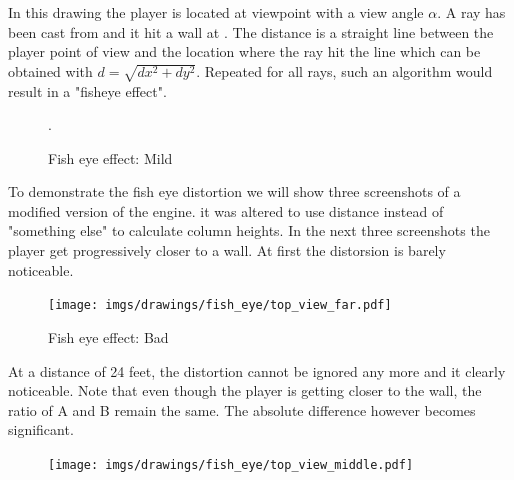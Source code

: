 In this drawing the player is located at viewpoint with a view angle \begin{math}\alpha\end{math}. A ray has been cast from  and it hit a wall at . The distance  is a straight line between the player point of view and the location where the ray hit the line which can be obtained with $d = \sqrt{dx^2 + dy^2}$. Repeated for all rays, such an algorithm would result in a "fisheye effect".

\begin{figure}[H]
\centering
 \caption{Fish eye effect: Mild}. \label{fig:mips}
 \end{figure}








\begin{minipage}{.5\textwidth}
To demonstrate the fish eye distortion we will show three screenshots of a modified version of the engine. it was altered to use distance  instead of "something else" to calculate column heights. In the next three screenshots the player get progressively closer to a wall. At first the distorsion is barely noticeable.
 \end{minipage}
\begin{minipage}{.5\textwidth}
\begin{figure}[H]
  \begin{flushright}
 \texttt{[image: imgs/drawings/fish\_eye/top\_view\_far.pdf]}
   \end{flushright}
\end{figure}
\end{minipage}

\par




\begin{figure}[H]
\centering
 \caption{Fish eye effect: Bad} \label{fig:mips}
 \end{figure}




\begin{minipage}{.5\textwidth}
At a distance of 24 feet, the distortion cannot be ignored any more and it clearly noticeable. Note that even though the player is getting closer to the wall, the ratio of A and B remain the same. The absolute difference however becomes significant.
 \end{minipage}
\begin{minipage}{.5\textwidth}
\begin{figure}[H]
  \begin{flushright}
 \texttt{[image: imgs/drawings/fish\_eye/top\_view\_middle.pdf]}
 \end{flushright}
\end{figure}
\end{minipage}






